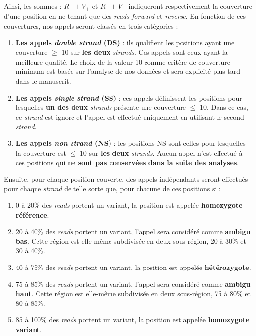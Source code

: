 \documentclass[12pt,a4paper,twoside]{ugathesis}
\theoremstyle{definition}
\theoremstyle{definition}
\theoremstyle{definition}
\theoremstyle{remark}
\begin{document}
Ainsi, les sommes : \(R_+ + V_+\) et \(R_- + V_-\) indiqueront
respectivement la couverture d'une position en ne tenant que des
\emph{reads forward} et \emph{reverse}. En fonction de ces couvertures,
nos appels seront classés en trois catégories :

\begin{enumerate}
\def\labelenumi{\arabic{enumi}.}
\item
  \textbf{Les appels \emph{double strand} (DS)} : ils qualifient les
  positions ayant une couverture \(\ge\) 10 sur \textbf{les deux}
  \emph{strands}. Ces appels sont ceux ayant la meilleure qualité. Le
  choix de la valeur 10 comme critère de couverture minimum est basée
  sur l'analyse de nos données et sera explicité plus tard dans le
  manuscrit.
\item
  \textbf{Les appels \emph{single strand} (SS)} : ces appels définissent
  les positions pour lesquelles \textbf{un des deux} \emph{strands}
  présente une couverture \(\le\) 10. Dans ce cas, ce \emph{strand} est
  ignoré et l'appel est effectué uniquement en utilisant le second
  \emph{strand}.
\item
  \textbf{Les appels \emph{non strand} (NS)} : les positions NS sont
  celles pour lesquelles la couverture est \(\le\) 10 sur \textbf{les
  deux} \emph{strands}. Aucun appel n'est effectué à ces positions qui
  \textbf{ne sont pas conservées dans la suite des analyses}.
\end{enumerate}

Ensuite, pour chaque position couverte, des appels indépendants seront
effectués pour chaque \emph{strand} de telle sorte que, pour chacune de
ces positions si :

\begin{enumerate}
\def\labelenumi{\arabic{enumi}.}
\item
  0 à 20\% des \emph{reads} portent un variant, la position est appelée
  \textbf{homozygote référence}.
\item
  20 à 40\% des \emph{reads} portent un variant, l'appel sera considéré
  comme \textbf{ambigu bas}. Cette région est elle-même subdivisée en
  deux sous-région, 20 à 30\% et 30 à 40\%.
\item
  40 à 75\% des \emph{reads} portent un variant, la position est appelée
  \textbf{hétérozygote}.
\item
  75 à 85\% des \emph{reads} portent un variant, l'appel sera considéré
  comme \textbf{ambigu haut}. Cette région est elle-même subdivisée en
  deux sous-région, 75 à 80\% et 80 à 85\%.
\item
  85 à 100\% des \emph{reads} portent un variant, la position est
  appelée \textbf{homozygote variant}.
\end{enumerate}
\end{document}
